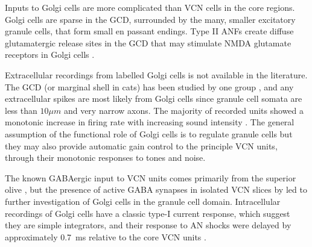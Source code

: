 


Inputs to Golgi cells are more complicated than VCN cells in the core
regions. Golgi cells are sparse in the GCD, surrounded by the many, smaller
excitatory granule cells, that form small en passant endings. Type II ANFs
create diffuse glutamatergic release sites in the GCD
\citep{HurdHutsonEtAl:1999,BensonBrown:2004} that may stimulate NMDA glutamate
receptors in Golgi cells \citep{FerragamoGoldingEtAl:1998a}.


Extracellular recordings from labelled Golgi cells is not available in the
literature.  The GCD (or marginal shell in cats) has been studied by one group
\citet{GhoshalKim:1997}, and any extracellular spikes are most likely from Golgi
cells since granule cell somata are less than $10{}\mu{m}$ and very narrow
axons. The majority of recorded units showed a monotonic increase in firing rate
with increasing sound intensity
\citep[Figure~\ref{fig:GolgiKimFig2}][]{GhoshalKim:1997}.  The general
assumption of the functional role of Golgi cells is to regulate granule cells
but they may also provide automatic gain control to the principle VCN units,
through their monotonic responses to tones and noise.


The known GABAergic input to VCN units comes primarily from the superior olive
\citep{}, but the presence of active GABA synapses in isolated VCN slices by
\citet{FerragamoGoldingEtAl:1998} led to further investigation of Golgi cells in
the granule cell domain. Intracellular recordings of Golgi cells have a classic
type-I current response, which suggest they are simple integrators, and their
response to AN shocks were delayed by approximately 0.7~ms relative to the core
VCN units \citep{FerragamoGoldingEtAl:1998}.

